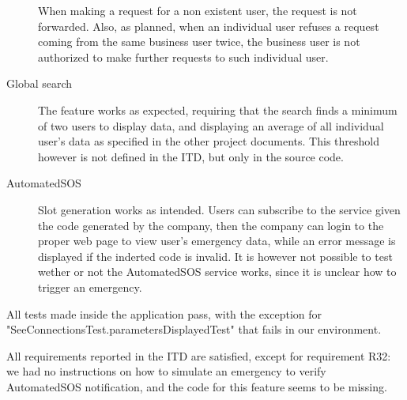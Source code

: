 \documentclass[../main.tex]{subfiles}
\begin{document}
\begin{description}
        When making a request for a non existent user, the request is not forwarded. Also, as planned, when an individual user refuses a request coming from the same business user twice, the business user is not authorized to make further requests to such individual user.
        \item [Global search] The feature works as expected, requiring that the search finds a minimum of two users to display data, and displaying an average of all individual user's data as specified in the other project documents. This threshold however is not defined in the ITD, but only in the source code.
        \item [AutomatedSOS] Slot generation works as intended. Users can subscribe to the service given the code generated by the company, then the company can login to the proper web page to view user's emergency data, while an error message is displayed if the inderted code is invalid. It is however not possible to test wether or not the AutomatedSOS service works, since it is unclear how to trigger an emergency.
    \end{description}

    All tests made inside the application pass, with the exception for "SeeConnectionsTest.parametersDisplayedTest" that fails in our environment.

    All requirements reported in the ITD are satisfied, except for requirement R32: we had no instructions on how to simulate an emergency to verify AutomatedSOS notification, and the code for this feature seems to be missing.
\end{document}
